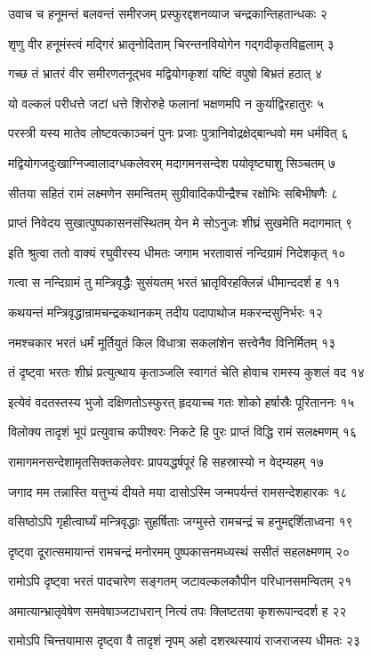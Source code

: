 उवाच च हनूमन्तं बलवन्तं समीरजम्
प्रस्फुरद्दशनव्याज चन्द्रकान्तिहतान्धकः २

शृणु वीर हनूमंस्त्वं मद्गिरं भ्रातृनोदिताम्
चिरन्तनवियोगेन गद्गदीकृतविह्वलाम् ३

गच्छ तं भ्रातरं वीर समीरणतनूद्भव
मद्वियोगकृशां यष्टिं वपुषो बिभ्रतं हठात् ४

यो वल्कलं परीधत्ते जटां धत्ते शिरोरुहे
फलानां भक्षणमपि न कुर्याद्विरहातुरः ५

परस्त्री यस्य मातेव लोष्टवत्काञ्चनं पुनः
प्रजाः पुत्रानिवोद्रक्षेद्बान्धवो मम धर्मवित् ६

मद्वियोगजदुःखाग्निज्वालादग्धकलेवरम्
मदागमनसन्देश पयोवृष्ट्याशु सिञ्चतम् ७

सीतया सहितं रामं लक्ष्मणेन समन्वितम्
सुग्रीवादिकपीन्द्रैश्च रक्षोभिः सबिभीषणैः ८

प्राप्तं निवेदय सुखात्पुष्पकासनसंस्थितम्
येन मे सोऽनुजः शीघ्रं सुखमेति मदागमात् ९

इति श्रुत्वा ततो वाक्यं रघुवीरस्य धीमतः
जगाम भरतावासं नन्दिग्रामं निदेशकृत् १०

गत्वा स नन्दिग्रामं तु मन्त्रिवृद्धैः सुसंयतम्
भरतं भ्रातृविरहक्लिन्नं धीमान्ददर्श ह ११

कथयन्तं मन्त्रिवृद्धान्रामचन्द्रकथानकम्
तदीय पदापाथोज मकरन्दसुनिर्भरः १२

नमश्चकार भरतं धर्मं मूर्तियुतं किल
विधात्रा सकलांशेन सत्त्वेनैव विनिर्मितम् १३

तं दृष्ट्वा भरतः शीघ्रं प्रत्युत्थाय कृताञ्जलि
स्वागतं चेति होवाच रामस्य कुशलं वद १४

इत्येवं वदतस्तस्य भुजो दक्षिणतोऽस्फुरत्
हृदयाच्च गतः शोको हर्षास्रैः पूरिताननः १५

विलोक्य तादृशं भूपं प्रत्युवाच कपीश्वरः
निकटे हि पुरः प्राप्तं विद्धि रामं सलक्ष्मणम् १६

रामागमनसन्देशामृतसिक्तकलेवरः
प्रापयद्धर्षपूरं हि सहस्रास्यो न वेद्म्यहम् १७

जगाद मम तन्नास्ति यत्तुभ्यं दीयते मया
दासोऽस्मि जन्मपर्यन्तं रामसन्देशहारकः १८

वसिष्ठोऽपि गृहीत्वार्घ्यं मन्त्रिवृद्धाः सुहर्षिताः
जग्मुस्ते रामचन्द्रं च हनुमद्दर्शिताध्वना १९

दृष्ट्वा दूरात्समायान्तं रामचन्द्रं मनोरमम्
पुष्पकासनमध्यस्थं ससीतं सहलक्ष्मणम् २०

रामोऽपि दृष्ट्वा भरतं पादचारेण सङ्गतम्
जटावल्कलकौपीन परिधानसमन्वितम् २१

अमात्यान्भ्रातृवेषेण समवेषाञ्जटाधरान्
नित्यं तपः क्लिष्टतया कृशरूपान्ददर्श ह २२

रामोऽपि चिन्तयामास दृष्ट्वा वै तादृशं नृपम्
अहो दशरथस्यायं राजराजस्य धीमतः २३

